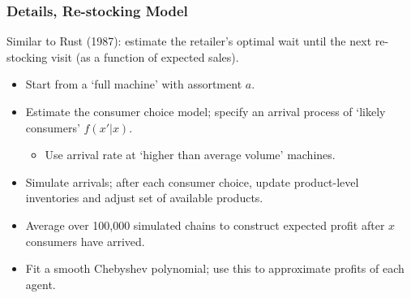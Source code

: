 \begin{frame}[label=supplemental1]
\frametitle{Details, Re-stocking Model}
Similar to Rust (1987): estimate the retailer's optimal wait until the next re-stocking visit (as a function of expected sales).
\vfill
\begin{itemize}
\item Start from a `full machine' with assortment $a$.
\item Estimate the consumer choice model; specify an arrival process of `likely consumers' $f(x' | x)$.
\begin{itemize}
\item Use arrival rate at `higher than average volume' machines.%
\end{itemize}
\item Simulate arrivals; after each consumer choice, update product-level inventories and adjust set of available products.
\item Average over 100,000 simulated chains to construct expected profit after $x$ consumers have arrived.
\item Fit a smooth Chebyshev polynomial; use this to approximate profits of each agent.
\end{itemize}
\vfill
\hyperlink{main}{}
\end{frame}



